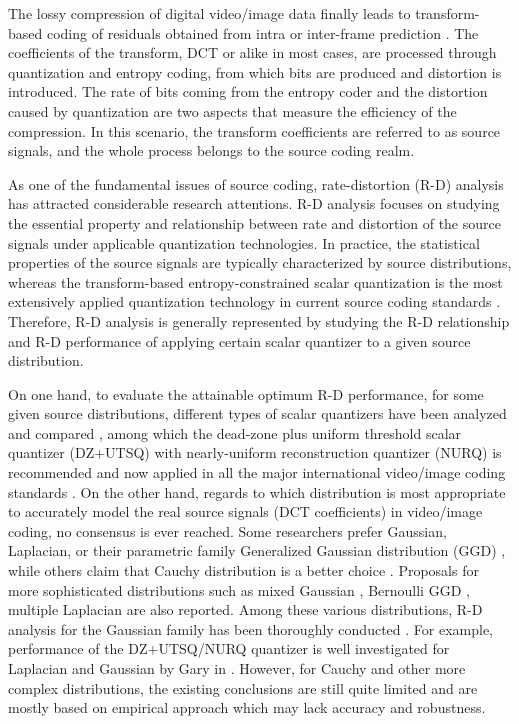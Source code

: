 \documentclass[smallabstract,smallcaptions]{dccpaper}
\begin{document}
\let\thefootnote\relax{}

The lossy compression of digital video/image data finally leads to transform-based coding of residuals obtained from intra or inter-frame prediction \cite{Sullivan_IEEE2005}. The coefficients of the transform, DCT or alike in most cases, are processed through quantization and entropy coding, from which bits are produced and distortion is introduced. The rate of bits coming from the entropy coder and the distortion caused by quantization are two aspects that measure the efficiency of the compression. In this scenario, the transform coefficients are referred to as source signals, and the whole process belongs to the source coding realm.

As one of the fundamental issues of source coding, rate-distortion (R-D) analysis has attracted considerable research attentions. R-D analysis focuses on studying the essential property and relationship between rate and distortion of the source signals under applicable quantization technologies. In practice, the statistical properties of the source signals are typically characterized by source distributions, whereas the transform-based entropy-constrained scalar quantization is the most extensively applied quantization technology in current source coding standards \cite{Hang_TCSVT1997}. Therefore, R-D analysis is generally represented by studying the R-D relationship and R-D performance of applying certain scalar quantizer to a given source distribution.

On one hand, to evaluate the attainable optimum R-D performance, for some given source distributions, different types of scalar quantizers have been analyzed and compared \cite{Sullivan_TIT1996}, among which the dead-zone plus uniform threshold scalar quantizer (DZ+UTSQ) with nearly-uniform reconstruction quantizer (NURQ) is recommended and now applied in all the major international video/image coding standards \cite{Sullivan_VCIP2005}. On the other hand, regards to which distribution is most appropriate to accurately model the real source signals (DCT coefficients) in video/image coding, no consensus is ever reached. Some researchers prefer Gaussian, Laplacian, or their parametric family Generalized Gaussian distribution (GGD) \cite{Pratt_Wiley1978,Smooth_SPIE1996,Sun_TCSVT2009}, while others claim that Cauchy distribution is a better choice \cite{Kamaci_TCSVT2005} \cite{Rod_TCSVT2010}. Proposals for more sophisticated distributions such as mixed Gaussian \cite{Eude_ICASSP1994}, Bernoulli GGD \cite{Fraysse_TIT2009}, multiple Laplacian \cite{Lee_TCSVT2014} are also reported. Among these various distributions, R-D analysis for the Gaussian family has been thoroughly conducted \cite{Sun_TIP2013}. For example, performance of the DZ+UTSQ/NURQ quantizer is well investigated for Laplacian and Gaussian by Gary in \cite{Sullivan_VCIP2005}. However, for Cauchy and other more complex distributions, the existing conclusions are still quite limited and are mostly based on empirical approach which may lack accuracy and robustness.
\end{document}

